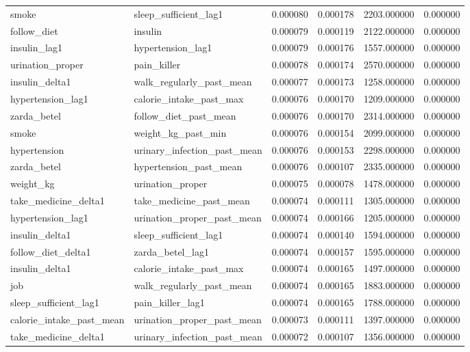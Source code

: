 \begin{longtable}{llrrrr}
smoke & sleep\_sufficient\_lag1 & 0.000080 & 0.000178 & 2203.000000 & 0.000000 \\
follow\_diet & insulin & 0.000079 & 0.000119 & 2122.000000 & 0.000000 \\
insulin\_lag1 & hypertension\_lag1 & 0.000079 & 0.000176 & 1557.000000 & 0.000000 \\
urination\_proper & pain\_killer & 0.000078 & 0.000174 & 2570.000000 & 0.000000 \\
insulin\_delta1 & walk\_regularly\_past\_mean & 0.000077 & 0.000173 & 1258.000000 & 0.000000 \\
hypertension\_lag1 & calorie\_intake\_past\_max & 0.000076 & 0.000170 & 1209.000000 & 0.000000 \\
zarda\_betel & follow\_diet\_past\_mean & 0.000076 & 0.000170 & 2314.000000 & 0.000000 \\
smoke & weight\_kg\_past\_min & 0.000076 & 0.000154 & 2099.000000 & 0.000000 \\
hypertension & urinary\_infection\_past\_mean & 0.000076 & 0.000153 & 2298.000000 & 0.000000 \\
zarda\_betel & hypertension\_past\_mean & 0.000076 & 0.000107 & 2335.000000 & 0.000000 \\
weight\_kg & urination\_proper & 0.000075 & 0.000078 & 1478.000000 & 0.000000 \\
take\_medicine\_delta1 & take\_medicine\_past\_mean & 0.000074 & 0.000111 & 1305.000000 & 0.000000 \\
hypertension\_lag1 & urination\_proper\_past\_mean & 0.000074 & 0.000166 & 1205.000000 & 0.000000 \\
insulin\_delta1 & sleep\_sufficient\_lag1 & 0.000074 & 0.000140 & 1594.000000 & 0.000000 \\
follow\_diet\_delta1 & zarda\_betel\_lag1 & 0.000074 & 0.000157 & 1595.000000 & 0.000000 \\
insulin\_delta1 & calorie\_intake\_past\_max & 0.000074 & 0.000165 & 1497.000000 & 0.000000 \\
job & walk\_regularly\_past\_mean & 0.000074 & 0.000165 & 1883.000000 & 0.000000 \\
sleep\_sufficient\_lag1 & pain\_killer\_lag1 & 0.000074 & 0.000165 & 1788.000000 & 0.000000 \\
calorie\_intake\_past\_mean & urination\_proper\_past\_mean & 0.000073 & 0.000111 & 1397.000000 & 0.000000 \\
take\_medicine\_delta1 & urinary\_infection\_past\_mean & 0.000072 & 0.000107 & 1356.000000 & 0.000000 \\

\end{longtable}
